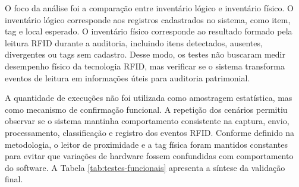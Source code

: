 O foco da análise foi a comparação entre inventário lógico e inventário físico. O inventário lógico corresponde aos registros cadastrados no sistema, como item, tag e local esperado. O inventário físico corresponde ao resultado formado pela leitura RFID durante a auditoria, incluindo itens detectados, ausentes, divergentes ou tags sem cadastro. Desse modo, os testes não buscaram medir desempenho físico da tecnologia RFID, mas verificar se o sistema transforma eventos de leitura em informações úteis para auditoria patrimonial.

A quantidade de execuções não foi utilizada como amostragem estatística, mas como mecanismo de confirmação funcional. A repetição dos cenários permitiu observar se o sistema mantinha comportamento consistente na captura, envio, processamento, classificação e registro dos eventos RFID. Conforme definido na metodologia, o leitor de proximidade e a tag física foram mantidos constantes para evitar que variações de hardware fossem confundidas com comportamento do software. A Tabela \ref{tab:testes-funcionais} apresenta a síntese da validação final.

